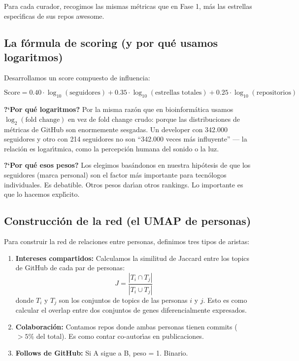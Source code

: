 \documentclass[11pt]{article}
\begin{document}
Para cada curador, recogimos las mismas m\'{e}tricas que en Fase 1, m\'{a}s las estrellas espec\'{\i}ficas de sus repos awesome.

\subsection{La f\'{o}rmula de scoring (y por qu\'{e} usamos logaritmos)}

Desarrollamos un score compuesto de influencia:

\[
\text{Score} = 0.40 \cdot \log_{10}(\text{seguidores}) + 0.35 \cdot \log_{10}(\text{estrellas totales}) + 0.25 \cdot \log_{10}(\text{repositorios})
\]

\textbf{?`Por qu\'{e} logaritmos?} Por la misma raz\'{o}n que en bioinform\'{a}tica usamos $\log_2(\text{fold change})$ en vez de fold change crudo: porque las distribuciones de m\'{e}tricas de GitHub son enormemente sesgadas. Un developer con 342.000 seguidores y otro con 214 seguidores no son ``342.000 veces m\'{a}s influyente'' --- la relaci\'{o}n es logar\'{\i}tmica, como la percepci\'{o}n humana del sonido o la luz.

\textbf{?`Por qu\'{e} esos pesos?} Los elegimos bas\'{a}ndonos en nuestra hip\'{o}tesis de que los seguidores (marca personal) son el factor m\'{a}s importante para tecn\'{o}logos individuales. Es debatible. Otros pesos dar\'{\i}an otros rankings. Lo importante es que lo hacemos expl\'{\i}cito.

\subsection{Construcci\'{o}n de la red (el UMAP de personas)}

Para construir la red de relaciones entre personas, definimos tres tipos de aristas:

\begin{enumerate}
    \item \textbf{Intereses compartidos:} Calculamos la similitud de Jaccard entre los topics de GitHub de cada par de personas:
    $$J = \frac{|T_i \cap T_j|}{|T_i \cup T_j|}$$
    donde $T_i$ y $T_j$ son los conjuntos de topics de las personas $i$ y $j$. Esto es como calcular el overlap entre dos conjuntos de genes diferencialmente expresados.

    \item \textbf{Colaboraci\'{o}n:} Contamos repos donde ambas personas tienen commits ($>5\%$ del total). Es como contar co-autor\'{\i}as en publicaciones.

    \item \textbf{Follows de GitHub:} Si A sigue a B, peso = 1. Binario.
\end{enumerate}
\end{document}
